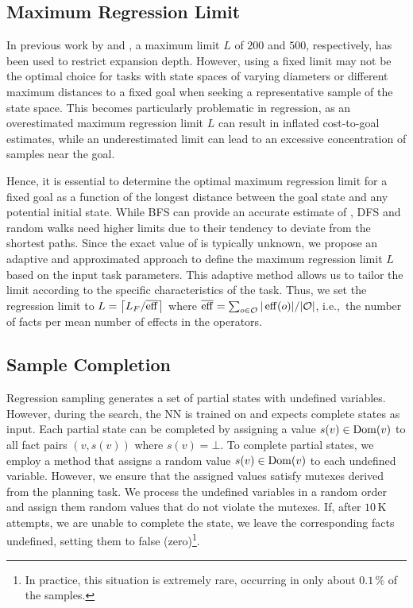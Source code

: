 \documentclass[ppgc,diss,english]{iiufrgs}
\providecommand{\ceil}[1]{\ensuremath{\left\lceil #1\right\rceil}}
\newcommand{\ppi}[2][inline]{\todo[color=purple!50,linecolor={purple!100},#1,fancyline,author=Pedro]{#2}}
\begin{document}
\ppi{Add pseudocode.}

\subsection{Maximum Regression Limit}
\label{sec:sample-maximum-regression-limit}
In previous work by \citet{Yu.etal/2020} and \citet{OToole/2022}, a maximum limit $L$ of $200$ and $500$, respectively, has been used to restrict expansion depth. However, using a fixed limit may not be the optimal choice for tasks with state spaces of varying diameters or different maximum distances to a fixed goal when seeking a representative sample of the state space. This becomes particularly problematic in regression, as an overestimated maximum regression limit $L$ can result in inflated cost-to-goal estimates, while an underestimated limit can lead to an excessive concentration of samples near the goal.

Hence, it is essential to determine the optimal maximum regression limit for a fixed goal as a function of the longest distance \distfarthest between the goal state and any potential initial state. While BFS can provide an accurate estimate of \distfarthest, DFS and random walks need higher limits due to their tendency to deviate from the shortest paths. Since the exact value of \distfarthest is typically unknown, we propose an adaptive and approximated approach to define the maximum regression limit $L$ based on the input task parameters. This adaptive method allows us to tailor the limit according to the specific characteristics of the task.
Thus, we set the regression limit to $L=\ceil{\facts/\overline{\eff}}$ where $\overline{\operatorname{eff}}=\sum_{o\in \mathcal{O}} |\operatorname{eff}(o)|/|\mathcal{O}|$, i.e.,~the number of facts per mean number of effects in the operators.

\subsection{Sample Completion}
\label{sec:sample-completion}

Regression sampling generates a set of partial states with undefined variables. However, during the search, the NN is trained on and expects complete states as input.
Each partial state can be completed by assigning a value $s(v)\in\operatorname{Dom}(v)$ to all fact pairs $(v,s(v))$ where $s(v)=\bot$.
To complete partial states, we employ a method that assigns a random value $s(v) \in \operatorname{Dom}(v)$ to each undefined variable. However, we ensure that the assigned values satisfy mutexes derived from the planning task. We process the undefined variables in a random order and assign them random values that do not violate the mutexes. If, after $10$\,K attempts, we are unable to complete the state, we leave the corresponding facts undefined, setting them to false (zero)\footnote{In practice, this situation is extremely rare, occurring in only about $0.1\,\%$ of the samples.}.
\end{document}
